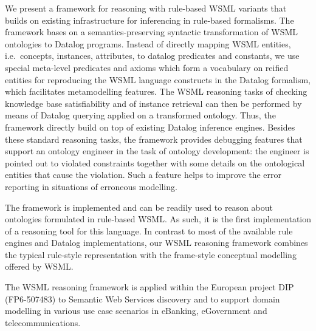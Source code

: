 We present a framework for reasoning with rule-based WSML variants
that builds on existing infrastructure for inferencing in
rule-based formalisms. The framework bases on a
semantics-preserving syntactic transformation of WSML ontologies
to Datalog programs. Instead of directly mapping WSML entities,
i.e.\ concepts, instances, attributes, to datalog predicates and
constants, we use special meta-level predicates and axioms which
form a vocabulary on reified entities for reproducing the WSML
language constructs in the Datalog formalism, which facilitates
metamodelling features. The WSML reasoning tasks of checking
knowledge base satisfiability and of instance retrieval can then
be performed by means of Datalog querying applied on a transformed
ontology. Thus, the framework directly build on top of existing
Datalog inference engines. Besides these standard reasoning tasks,
the framework provides debugging features that support an ontology
engineer in the task of ontology development: the engineer is
pointed out to violated constraints together with some details on
the ontological entities that cause the violation. Such a feature
helps to improve the error reporting in situations of erroneous
modelling.

The framework is implemented and can be readily used to reason
about ontologies formulated in rule-based WSML. As such, it is the
first implementation of a reasoning tool for this language. In
contrast to most of the available rule engines and Datalog
implementations, our WSML reasoning framework combines the typical
rule-style representation with the frame-style conceptual
modelling offered by WSML.

The WSML reasoning framework is applied within the European
project DIP (FP6-507483) to Semantic Web Services discovery and to
support domain modelling in various use case scenarios in
eBanking, eGovernment and telecommunications.
